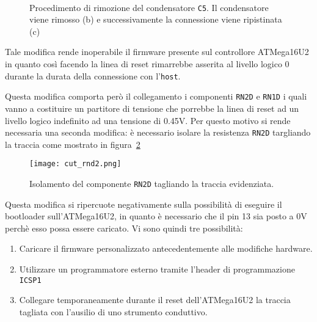 \begin{figure}[t]
    \hfill
    \begin{minipage}{.45\textwidth}
    \end{minipage}
    \begin{minipage}{.45\textwidth}
         \\
    \end{minipage}
    \hfill
    \caption[]{Procedimento di rimozione del condensatore \texttt{C5}. Il condensatore viene rimosso (b) e successivamente la connessione viene ripistinata (c)}\label{fig:remove-c5}
\end{figure}

Tale modifica rende inoperabile il firmware presente sul controllore ATMega16U2 in quanto così facendo la linea di reset rimarrebbe asserita al livello logico 0 durante la durata della connessione con l'\texttt{host}.

Questa modifica comporta però il collegamento i componenti \texttt{RN2D} e \texttt{RN1D} i quali vanno a costituire un partitore di tensione che porrebbe la linea di reset ad un livello logico indefinito ad una tensione di 0.45V. Per questo motivo si rende necessaria una seconda modifica: è necessario isolare la resistenza \texttt{RN2D} targliando la traccia come mostrato in figura~\ref{fig:cut-rnd2}

\begin{figure}[b]
    \centering
    \texttt{[image: cut\_rnd2.png]}
    \caption[]{Isolamento del componente \texttt{RN2D} tagliando la traccia evidenziata.}\label{fig:cut-rnd2}
\end{figure}

Questa modifica si ripercuote negativamente sulla possibilità di eseguire il bootloader sull'ATMega16U2, in quanto è necessario che il pin 13 sia posto a 0V perchè esso possa essere caricato. Vi sono quindi tre possibilità:
\begin{enumerate}
    \item Caricare il firmware personalizzato antecedentemente alle modifiche hardware.
    \item Utilizzare un programmatore esterno tramite l'header di programmazione \texttt{ICSP1}
    \item Collegare temporaneamente durante il reset dell'ATMega16U2 la traccia tagliata con l'ausilio di uno strumento conduttivo.
\end{enumerate} 

